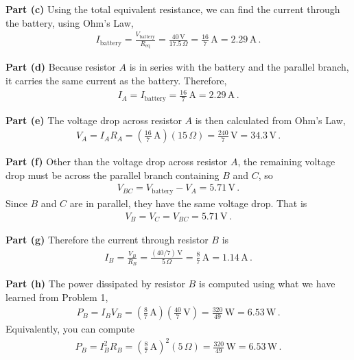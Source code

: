 \documentclass[11pt]{article}
\begin{document}
\noindent\textbf{Part (c)} Using the total equivalent resistance, we can find the current through the battery, using Ohm's Law,
\begin{align*}
I_{\text{battery}} = \frac{V_{\text{battery}}}{R_{\text{eq}}} = \frac{40\,\text{V}}{17.5\,\Omega}
= \frac{16}{7}\,\text{A} = 2.29\,\text{A}\,.
\end{align*}

\noindent\textbf{Part (d)} Because resistor $A$ is in series with the battery and the parallel branch, it carries the same current as the battery. Therefore,
\begin{align*}
I_A = I_{\text{battery}} = \frac{16}{7}\,\text{A} = 2.29\,\text{A}\,.
\end{align*}

\noindent\textbf{Part (e)} The voltage drop across resistor $A$ is then calculated from Ohm's Law,
\begin{align*}
V_A = I_A R_A = \left(\frac{16}{7}\,\text{A}\right)(15\,\Omega)
= \frac{240}{7}\,\text{V} = 34.3\,\text{V}\,.
\end{align*}

\noindent\textbf{Part (f)} Other than the voltage drop across resistor $A$, the remaining voltage drop must be across the parallel branch containing $B$ and $C$, so
\begin{align*}
V_{BC} = V_{\text{battery}} - V_A
= 5.71\,\text{V}\,.
\end{align*}
Since $B$ and $C$ are in parallel, they have the same voltage drop. That is
\begin{align*}
V_B = V_C = V_{BC} = 5.71\,\text{V}\,.
\end{align*}

\noindent\textbf{Part (g)} Therefore the current through resistor $B$ is
\begin{align*}
I_B = \frac{V_B}{R_B} = \frac{(40/7)\,\text{V}}{5\,\Omega}
= \frac{8}{7}\,\text{A} = 1.14\,\text{A}\,.
\end{align*}

\noindent\textbf{Part (h)} The power dissipated by resistor $B$ is computed using what we have learned from Problem 1,
\begin{align*}
P_B = I_BV_B
= \left(\frac{8}{7}\,\text{A}\right)\left(\frac{40}{7}\,\text{V}\right)
= \frac{320}{49}\,\text{W}
= 6.53\,\text{W}\,.
\end{align*}
Equivalently, you can compute
\begin{align*}
P_B = I_B^2R_B = \left(\frac{8}{7}\,\text{A}\right)^2(5\,\Omega)
= \frac{320}{49}\,\text{W}
= 6.53\,\text{W}\,.
\end{align*}
\end{document}
